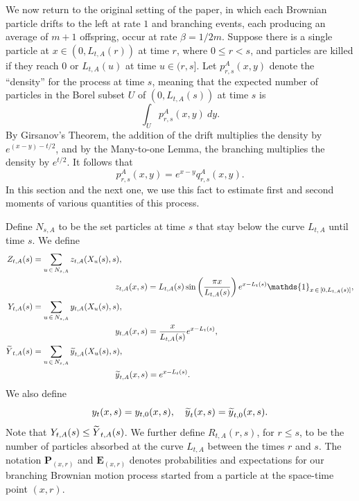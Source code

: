 \documentclass[AHL,Unicode,longabstracts,published]{cedram}
\newcommand*\E{\mathbf{E}}
\renewcommand*\P{\mathbf{P}}
\newcommand{\1} {\mathds{1}}
\let\oldtilde\tilde
\renewcommand*{\tilde}[1]{\mathchoice{\widetilde{#1}}{\widetilde{#1}}{\oldtilde{#1}}{\oldtilde{#1}}}
\begin{document}
We now return to the original setting of the paper, in which each Brownian particle drifts to the left at rate $1$ and branching events, each producing an average of $m+1$ offspring, occur at rate $\beta = 1/2m$. Suppose there is a single particle at $x \in (0, L_{t,A}(r))$ at time $r$, where $0 \leq r < s$, and particles are killed if they reach $0$ or $L_{t,A}(u)$ at time $u \in (r, s]$. Let $p_{r,s}^A(x,y)$ denote the ``density'' for the process at time $s$, meaning that the expected number of particles in the Borel subset $U$ of $(0, L_{t,A}(s))$ at time $s$ is
\[
\int_U p_{r,s}^A(x,y) \: dy.
\]
By Girsanov's Theorem, the addition of the drift multiplies the density by $e^{(x - y) - t/2}$, and by the Many-to-one Lemma, the branching multiplies the density by $e^{t/2}$. It follows that
\[
p_{r,s}^A(x,y) = e^{x-y} q_{r,s}^A(x,y).
\]
In this section and the next one, we use this fact to estimate first and second moments of various quantities of this process.

Define $N_{s,A}$ to be the set particles at time $s$ that stay below the curve $L_{t,A}$ until time $s$. We define
\begin{align*}
 Z_{t,A}(s) &= \sum_{u\,\in\,N_{s,A}} z_{t,A}(X_u(s),s),\\
&\mkern180mu z_{t,A}(x,s) = L_{t,A}(s)\sin\left(\frac{\pi x}{L_{t,A}(s)}\right)e^{x-L_t(s)}\1_{x\,\in\,\left[0,L_{t,A}(s)\right]},\\
Y_{t,A}(s) &= \sum_{u\,\in\,N_{s,A}} y_{t,A}(X_u(s),s),\\
&\mkern180mu y_{t,A}(x,s) = \frac x {L_{t,A}(s)} e^{x-L_t(s)}, \\
{\tilde Y}_{t,A}(s) &= \sum_{u\,\in\,N_{s,A}} {\tilde y}_{t,A}(X_u(s), s),\\
&\mkern180mu {\tilde y}_{t,A}(x,s) = e^{x-L_t(s)}.
\end{align*}
We also define
\[
y_t(x,s) = y_{t,0}(x,s), \quad {\tilde y}_t(x,s) = {\tilde y}_{t,0}(x,s).
\]
Note that $Y_{t,A}(s) \leq {\tilde Y}_{t,A}(s)$. We further define $R_{t,A}(r,s)$, for $r\le s$, to be the number of particles absorbed at the curve $L_{t,A}$ between the times $r$ and $s$. The notation $\P_{(x,r)}$ and $\E_{(x,r)}$ denotes probabilities and expectations for our branching Brownian motion process started from a particle at the space-time point $(x,r)$.
\end{document}
